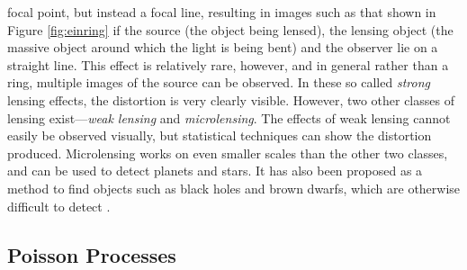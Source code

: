 \documentclass[a4paper,11pt,twoside]{article}
\begin{document}
   focal point, but instead a focal line, resulting in images such as that shown
   in Figure \ref{fig:einring} if the source (the object being lensed), the
   lensing object (the massive object around which the light is being bent) and
   the observer lie on a straight line. This effect is relatively rare, however,
   and in general rather than a ring, multiple images of the source can be
   observed. In these so called \emph{strong} lensing effects, the distortion is
   very clearly visible. However, two other classes of lensing
   exist---\emph{weak lensing} and \emph{microlensing}.  The effects of weak
   lensing cannot easily be observed visually, but statistical techniques can
   show the distortion produced. Microlensing works on even smaller scales than
   the other two classes, and can be used to detect planets and stars. It has
   also been proposed as a method to find objects such as black holes and brown
   dwarfs, which are otherwise difficult to detect
   \cite{schneider2006gravitational}.
\subsection{Poisson Processes}
\label{sec-2-2}
\end{document}

